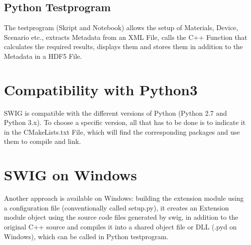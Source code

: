 \subsection{Python Testprogram}
The testprogram (Skript and Notebook) allows the setup of Materials, Device, Scenario etc., extracts Metadata from an XML File, calls the C++ Function that calculates the required results, displays them and  stores them in addition to the Metadata in a HDF5 File.

\section{Compatibility with Python3}
SWIG is compatible with the different versions of Python (Python 2.7 and Python 3.x). To choose a specific version, all that has to be done is to indicate it in the CMakeLists.txt File, which will find the corresponding packages and use them to compile and link.

\section{SWIG on Windows}
Another approach is available on Windows: building the extension module using a configuration file (conventionally called setup.py), it creates an Extension module object using the source code files generated by swig, in addition to the original C++ source and compiles it into a shared object file or DLL (.pyd on Windows), which can be called in Python testprogram. 


